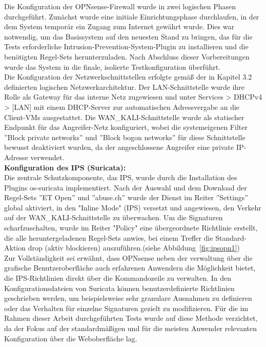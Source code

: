 Die Konfiguration der OPNsense-Firewall wurde in zwei logischen Phasen durchgeführt. Zunächst wurde eine initiale Einrichtungsphase durchlaufen, in der dem System temporär ein Zugang zum Internet gewährt wurde. Dies war notwendig, um das Basissystem auf den neuesten Stand zu bringen, das für die Tests erforderliche Intrusion-Prevention-System-Plugin zu installieren und die benötigten Regel-Sets herunterzuladen. Nach Abschluss dieser Vorbereitungen wurde das System in die finale, isolierte Testkonfiguration überführt.\\

Die Konfiguration der Netzwerkschnittstellen erfolgte gemäß der in Kapitel 3.2 definierten logischen Netzwerkarchitektur. Der LAN-Schnittstelle wurde ihre Rolle als Gateway für das interne Netz zugewiesen und unter Services > DHCPv4 > [LAN] mit einem DHCP-Server zur automatischen Adressvergabe an die Client-VMs ausgestattet. Die WAN\_KALI-Schnittstelle wurde als statischer Endpunkt für das Angreifer-Netz konfiguriert, wobei die systemeigenen Filter ''Block private networks'' und ''Block bogon networks'' für diese Schnittstelle bewusst deaktiviert wurden, da der angeschlossene Angreifer eine private IP-Adresse verwendet.\\

\textbf{Konfiguration des IPS (Suricata):}\\
Die zentrale Schutzkomponente, das IPS, wurde durch die Installation des Plugins os-suricata implementiert. Nach der Auswahl und dem Download der Regel-Sets ''ET Open'' und ''abuse.ch'' wurde der Dienst im Reiter ''Settings'' global aktiviert, in den "Inline Mode" (IPS) versetzt und angewiesen, den Verkehr auf der WAN\_KALI-Schnittstelle zu überwachen. Um die Signaturen scharfzuschalten, wurde im Reiter "Policy" eine übergeordnete Richtlinie erstellt, die alle heruntergeladenen Regel-Sets anwies, bei einem Treffer die Standard-Aktion drop (aktiv blockieren) auszuführen.(siehe Abbildung~\ref{fig:ipsopn1})\\

Zur Vollständigkeit sei erwähnt, dass OPNsense neben der verwaltung über die grafische Benutzeroberfläche auch erfahrenen Anwendern die Möglichkeit bietet, die IPS-Richtlinien direkt über die Kommandozeile zu verwalten. In den Konfigurationsdateien von Suricata können benutzerdefinierte Richtlinien geschrieben werden, um beispielsweise sehr granulare Ausnahmen zu definieren oder das Verhalten für einzelne Signaturen gezielt zu modifizieren. Für die im Rahmen dieser Arbeit durchgeführten Tests wurde auf diese Methode verzichtet, da der Fokus auf der standardmäßigen und für die meisten Anwender relevanten Konfiguration über die Weboberfläche lag.\\

